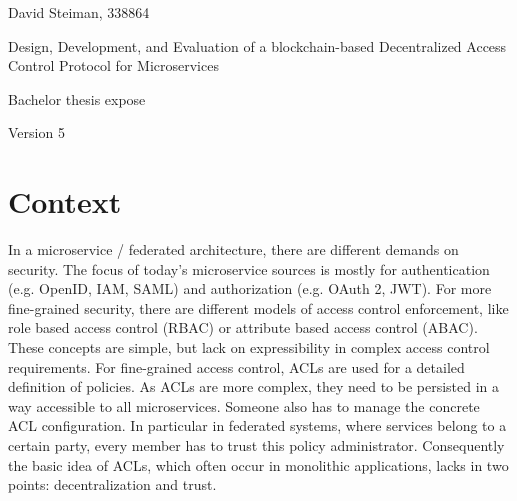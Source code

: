 \documentclass[12pt, conference]{IEEEtran}
\begin{document}
\pagestyle{empty}
\onecolumn

\clearscrheadings\clearscrplain
\begin{center}
David Steiman, 338864 \\

\vspace{8cm}

\begin{Huge}
Design, Development, and Evaluation of a blockchain-based Decentralized Access Control Protocol for Microservices \\
\end{Huge}
\begin{Large}
Bachelor thesis expose \\
\end{Large}
Version 5 \\


\end{center}
\clearpage

\twocolumn
\pagestyle{useheadings}

\tableofcontents

\section{Context}
In a microservice / federated architecture, there are different demands on security. The focus of today's microservice sources is mostly for authentication (e.g. OpenID, IAM, SAML) and authorization (e.g. OAuth 2, JWT). For more fine-grained security, there are different models of access control enforcement, like role based access control (RBAC) or attribute based access control (ABAC). These concepts are simple, but lack on expressibility in complex access control requirements.  For fine-grained access control, ACLs are used for a detailed definition of policies. As ACLs are more complex, they need to be persisted in a way accessible to all microservices. Someone also has to manage the concrete ACL configuration. In particular in federated systems, where services belong to a certain party, every member has to trust this policy administrator.
Consequently the basic idea of ACLs, which often occur in monolithic applications, lacks in two points: decentralization and trust.
\end{document}
